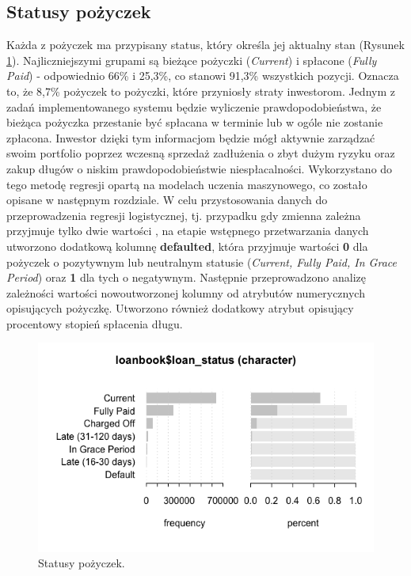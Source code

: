 \subsection{Statusy pożyczek}

Każda z pożyczek ma przypisany status, który określa jej aktualny stan (Rysunek \ref{lc:statuses}). Najliczniejszymi grupami są bieżące pożyczki (\textit{Current}) i spłacone (\textit{Fully Paid}) - odpowiednio 66\% i 25,3\%, co stanowi 91,3\% wszystkich pozycji. Oznacza to, że 8,7\% pożyczek to pożyczki, które przyniosły straty inwestorom. Jednym z zadań implementowanego systemu będzie wyliczenie prawdopodobieństwa, że bieżąca pożyczka przestanie być spłacana w terminie lub w ogóle nie zostanie zpłacona. Inwestor dzięki tym informacjom będzie mógł aktywnie zarządzać swoim portfolio poprzez wczesną sprzedaż zadłużenia o zbyt dużym ryzyku oraz zakup długów o niskim prawdopodobieństwie niespłacalności. Wykorzystano do tego metodę regresji opartą na modelach uczenia maszynowego, co zostało opisane w następnym rozdziale. W celu przystosowania danych do przeprowadzenia regresji logistycznej, tj. przypadku gdy zmienna zależna przyjmuje tylko dwie wartości \cite{MED}, na etapie wstępnego przetwarzania danych utworzono dodatkową kolumnę \textbf{defaulted}, która przyjmuje wartości \textbf{0} dla pożyczek o pozytywnym lub neutralnym statusie (\textit{Current, Fully Paid, In Grace Period}) oraz \textbf{1} dla tych o negatywnym. Następnie przeprowadzono analizę zależności wartości nowoutworzonej kolumny od atrybutów numerycznych opisujących pożyczkę. Utworzono również dodatkowy atrybut opisujący procentowy stopień spłacenia długu.

\begin{figure}[h] \centering %
	\includegraphics[scale=0.5]{img/statuses.png}
	\caption{Statusy pożyczek.}
	\label{lc:statuses}
\end{figure}

